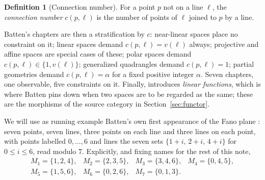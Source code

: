 \documentclass[11pt]{article}
\theoremstyle{plain}
\theoremstyle{definition}
\newtheorem{definition}[theorem]{Definition}
\theoremstyle{remark}
\begin{document}
\begin{definition}[Connection number]
For a point $p$ not on a line $\ell$, the \emph{connection number} $c(p,\ell)$ is the
number of points of $\ell$ joined to $p$ by a line.
\end{definition}

Batten's chapters are then a stratification by $c$: near-linear spaces place no constraint
on it; linear spaces demand $c(p,\ell) = v(\ell)$ always; projective and affine spaces are
special cases of these; polar spaces demand $c(p,\ell) \in \{1, v(\ell)\}$; generalized
quadrangles demand $c(p,\ell) = 1$; partial geometries demand $c(p,\ell) = \alpha$ for a
fixed positive integer $\alpha$. Seven chapters, one observable, five constraints on it.
Finally, \cite[\S1.7]{Batten} introduces \emph{linear functions}, which is where Batten
pins down when two spaces are to be regarded as the same; these are the morphisms of the
source category in Section~\ref{sec:functor}.

We will use as running example Batten's own first appearance of the Fano plane
\cite[Example 1.1.2]{Batten}: seven points, seven lines, three points on each line and
three lines on each point, with points labelled $0,\dots,6$ and lines the seven sets
$\{1+i,\,2+i,\,4+i\}$ for $0 \le i \le 6$, read modulo $7$. Explicitly, and fixing names
for the rest of this note,
\[
\begin{array}{llll}
M_1 = \{1,2,4\}, & M_2 = \{2,3,5\}, & M_3 = \{3,4,6\}, & M_4 = \{0,4,5\},\\
M_5 = \{1,5,6\}, & M_6 = \{0,2,6\}, & M_7 = \{0,1,3\}. &
\end{array}
\]
\end{document}
